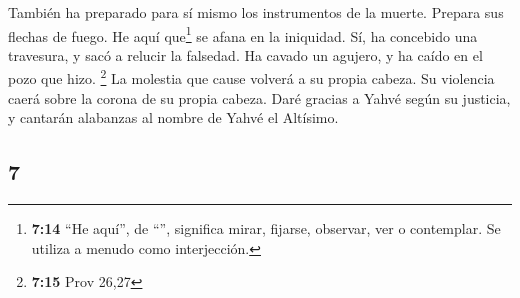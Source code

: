 \begin{paracol}{2}
 También ha preparado para sí mismo los instrumentos de
la muerte. Prepara sus flechas de fuego.  He aquí
que\footnote{\textbf{7:14} ``He aquí'', de ``'', significa
  mirar, fijarse, observar, ver o contemplar. Se utiliza a menudo como
  interjección.} se afana en la iniquidad. Sí, ha concebido una
travesura, y sacó a relucir la falsedad.  Ha cavado un
agujero, y ha caído en el pozo que hizo. \footnote{\textbf{7:15} Prov
  26,27}  La molestia que cause volverá a su propia
cabeza. Su violencia caerá sobre la corona de su propia cabeza.
 Daré gracias a Yahvé según su justicia, y cantarán
alabanzas al nombre de Yahvé el Altísimo.

\switchcolumn
\begin{otherlanguage}{english}

\hypertarget{section-13}{%
\section{7}\label{section-13}}


\end{otherlanguage}
\end{paracol}
